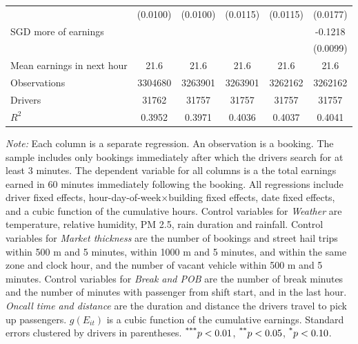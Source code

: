 \documentclass[reviewmode]{restat}
\begin{document}
\begin{table}[]
{\begin{tabularx}{\textwidth}{l@{\extracolsep{\fill}}*{5}{S[table-format = 0.4, table-space-text-pre={**}, table-space-text-post={-**}]}}
                &    (0.0100)         &    (0.0100)         &    (0.0115)         &    (0.0115)         &    (0.0177)         \\
     SGD more of earnings&                     &                     &                     &                     &     -0.1218\sym{***}         \\
                &                     &                     &                     &                     &    (0.0099)         \\
    \midrule
    Mean earnings in next hour&     \num{21.6}         &     \num{21.6}         &     \num{21.6}         &     \num{21.6}         &     \num{21.6}         \\
    Observations&\num{3304680}         &\num{3263901}         &\num{3263901}         &\num{3262162}         &\num{3262162}         \\
    Drivers     & \num{31762}         & \num{31757}         & \num{31757}         & \num{31757}         & \num{31757}         \\
    \(R^2\)     &      0.3952         &      0.3971         &      0.4036         &      0.4037         &      0.4041         \\
    \bottomrule
    \end{tabularx}
    }
	\begin{tablenotes}
	\small
        \textit{Note:} Each column is a separate regression. An observation is a booking. The sample includes only bookings immediately after which the drivers search for at least 3 minutes. The dependent variable for all columns is a the total earnings earned in 60 minutes immediately following the booking. All regressions include driver fixed effects, hour-day-of-week\(\times\)building fixed effects, date fixed effects, and a cubic function of the cumulative hours. Control variables for \textit{Weather} are temperature, relative humidity, PM 2.5, rain duration and rainfall. Control variables for \textit{Market thickness} are the number of bookings and street hail trips within 500 m and 5 minutes, within 1000 m and 5 minutes, and within the same zone and clock hour, and the number of vacant vehicle within 500 m and 5 minutes. Control variables for \textit{Break and POB} are the number of break minutes and the number of minutes with passenger from shift start, and in the last hour. \textit{Oncall time and distance} are the duration and distance the drivers travel to pick up passengers. \(g(E_{it})\) is a cubic function of the cumulative earnings. Standard errors clustered by drivers in parentheses. $\textsuperscript{***}p < 0.01$, $\textsuperscript{**}p < 0.05$, $\textsuperscript{*}p < 0.10$. 
	\end{tablenotes}
\end{table}
\end{document}
